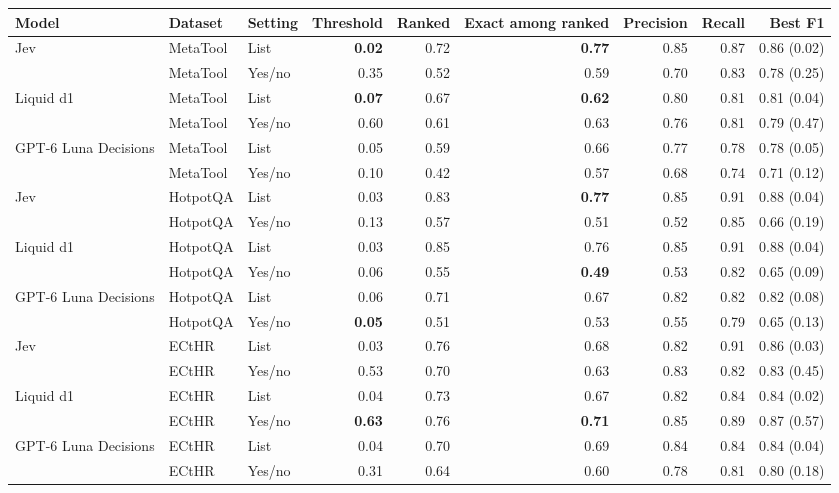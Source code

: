 \begin{tabular}{lllrrrrrr}
\toprule
Model & Dataset & Setting & Threshold & Ranked & Exact among ranked & Precision & Recall & Best F1 \\
\midrule
Jev & MetaTool & List & \textbf{0.02} & 0.72 & \textbf{0.77} & 0.85 & 0.87 & 0.86 (0.02) \\
 & MetaTool & Yes/no & 0.35 & 0.52 & 0.59 & 0.70 & 0.83 & 0.78 (0.25) \\
\midrule
Liquid d1 & MetaTool & List & \textbf{0.07} & 0.67 & \textbf{0.62} & 0.80 & 0.81 & 0.81 (0.04) \\
 & MetaTool & Yes/no & 0.60 & 0.61 & 0.63 & 0.76 & 0.81 & 0.79 (0.47) \\
\midrule
GPT-6 Luna Decisions & MetaTool & List & 0.05 & 0.59 & 0.66 & 0.77 & 0.78 & 0.78 (0.05) \\
 & MetaTool & Yes/no & 0.10 & 0.42 & 0.57 & 0.68 & 0.74 & 0.71 (0.12) \\
\midrule
Jev & HotpotQA & List & 0.03 & 0.83 & \textbf{0.77} & 0.85 & 0.91 & 0.88 (0.04) \\
 & HotpotQA & Yes/no & 0.13 & 0.57 & 0.51 & 0.52 & 0.85 & 0.66 (0.19) \\
\midrule
Liquid d1 & HotpotQA & List & 0.03 & 0.85 & 0.76 & 0.85 & 0.91 & 0.88 (0.04) \\
 & HotpotQA & Yes/no & 0.06 & 0.55 & \textbf{0.49} & 0.53 & 0.82 & 0.65 (0.09) \\
\midrule
GPT-6 Luna Decisions & HotpotQA & List & 0.06 & 0.71 & 0.67 & 0.82 & 0.82 & 0.82 (0.08) \\
 & HotpotQA & Yes/no & \textbf{0.05} & 0.51 & 0.53 & 0.55 & 0.79 & 0.65 (0.13) \\
\midrule
Jev & ECtHR & List & 0.03 & 0.76 & 0.68 & 0.82 & 0.91 & 0.86 (0.03) \\
 & ECtHR & Yes/no & 0.53 & 0.70 & 0.63 & 0.83 & 0.82 & 0.83 (0.45) \\
\midrule
Liquid d1 & ECtHR & List & 0.04 & 0.73 & 0.67 & 0.82 & 0.84 & 0.84 (0.02) \\
 & ECtHR & Yes/no & \textbf{0.63} & 0.76 & \textbf{0.71} & 0.85 & 0.89 & 0.87 (0.57) \\
\midrule
GPT-6 Luna Decisions & ECtHR & List & 0.04 & 0.70 & 0.69 & 0.84 & 0.84 & 0.84 (0.04) \\
 & ECtHR & Yes/no & 0.31 & 0.64 & 0.60 & 0.78 & 0.81 & 0.80 (0.18) \\
\bottomrule
\end{tabular}
